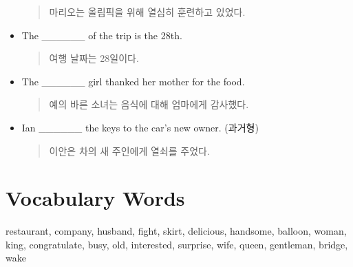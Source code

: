 \documentclass{article}
\begin{document}
\begin{addmargin}[1em]{1em}
\begin{itemize}
    \begin{quote}
    마리오는 올림픽을 위해 열심히 훈련하고 있었다.
    \end{quote}
    \item The \_\_\_\_\_\_ of the trip is the 28th.
    \begin{quote}
    여행 날짜는 28일이다.
    \end{quote}
    \item The \_\_\_\_\_\_ girl thanked her mother for the food.
    \begin{quote}
    예의 바른 소녀는 음식에 대해 엄마에게 감사했다.
    \end{quote}
    \item Ian \_\_\_\_\_\_ the keys to the car's new owner. (과거형)
    \begin{quote}
    이안은 차의 새 주인에게 열쇠를 주었다.
    \end{quote}
\end{itemize}
\end{addmargin}

\newpage

\section*{Vocabulary Words}
\begin{addmargin}[1em]{1em}
restaurant, company, husband, fight, skirt, delicious, handsome, balloon, woman, king, congratulate, busy, old, interested, surprise, wife, queen, gentleman, bridge, wake
\end{addmargin}
\end{document}
